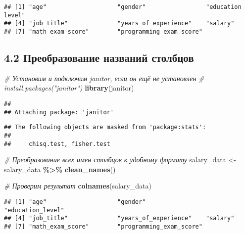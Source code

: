 \documentclass[
]{article}
\newenvironment{Shaded}{\begin{snugshade}}{\end{snugshade}}
\newcommand{\CommentTok}[1]{\textcolor[rgb]{0.56,0.35,0.01}{\textit{#1}}}
\newcommand{\FunctionTok}[1]{\textcolor[rgb]{0.13,0.29,0.53}{\textbf{#1}}}
\newcommand{\NormalTok}[1]{#1}
\newcommand{\OtherTok}[1]{\textcolor[rgb]{0.56,0.35,0.01}{#1}}
\newcommand{\SpecialCharTok}[1]{\textcolor[rgb]{0.81,0.36,0.00}{\textbf{#1}}}
\begin{document}
\begin{verbatim}
## [1] "age"                    "gender"                 "education level"       
## [4] "job title"              "years of experience"    "salary"                
## [7] "math exam score"        "programming exam score"
\end{verbatim}

\subsection{4.2 Преобразование названий
столбцов}\label{ux43fux440ux435ux43eux431ux440ux430ux437ux43eux432ux430ux43dux438ux435-ux43dux430ux437ux432ux430ux43dux438ux439-ux441ux442ux43eux43bux431ux446ux43eux432}

\begin{Shaded}
\begin{Highlighting}[]
\CommentTok{\# Установим и подключим janitor, если он ещё не установлен}
\CommentTok{\# install.packages("janitor")}
\FunctionTok{library}\NormalTok{(janitor)}
\end{Highlighting}
\end{Shaded}

\begin{verbatim}
## 
## Attaching package: 'janitor'
\end{verbatim}

\begin{verbatim}
## The following objects are masked from 'package:stats':
## 
##     chisq.test, fisher.test
\end{verbatim}

\begin{Shaded}
\begin{Highlighting}[]
\CommentTok{\# Преобразование всех имен столбцов к удобному формату}
\NormalTok{salary\_data }\OtherTok{\textless{}{-}}\NormalTok{ salary\_data }\SpecialCharTok{\%\textgreater{}\%} \FunctionTok{clean\_names}\NormalTok{()}

\CommentTok{\# Проверим результат}
\FunctionTok{colnames}\NormalTok{(salary\_data)}
\end{Highlighting}
\end{Shaded}

\begin{verbatim}
## [1] "age"                    "gender"                 "education_level"       
## [4] "job_title"              "years_of_experience"    "salary"                
## [7] "math_exam_score"        "programming_exam_score"
\end{verbatim}
\end{document}
